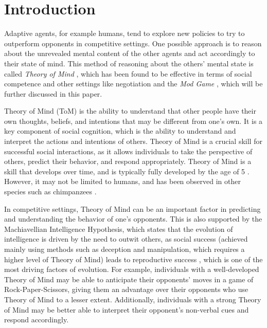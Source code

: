 \section{Introduction}\label{sec:introduction}

Adaptive agents, for example humans, tend to explore new policies to try to outperform opponents in competitive settings. One possible approach is to reason about the unrevealed mental content of the other agents and act accordingly to their state of mind. This method of reasoning about the others' mental state is called \textit{Theory of Mind} \citep{premack1978does}, which has been found to be effective in terms of social competence \citep{liddle2006higher} and other settings like negotiation \citep{de2017negotiating} and the \textit{Mod Game} \citep{veltman2019training}, which will be further discussed in this paper.

Theory of Mind (ToM) is the ability to understand that other people have their own thoughts, beliefs, and intentions that may be different from one's own. It is a key component of social cognition, which is the ability to understand and interpret the actions and intentions of others. Theory of Mind is a crucial skill for successful social interactions, as it allows individuals to take the perspective of others, predict their behavior, and respond appropriately. Theory of Mind is a skill that develops over time, and is typically fully developed by the age of 5 \citep{call2008does}. However, it may not be limited to humans, and has been observed in other species such as chimpanzees \citep{premack1978does}.

In competitive settings, Theory of Mind can be an important factor in predicting and understanding the behavior of one's opponents. This is also supported by the Machiavellian Intelligence Hypothesis, which states that the evolution of intelligence is driven by the need to outwit others, as social success (achieved mainly using methods such as deception and manipulation, which requires a higher level of Theory of Mind) leads to reproductive success \citep{gavrilets2006dynamics}, which is one of the most driving factors of evolution. For example, individuals with a well-developed Theory of Mind may be able to anticipate their opponents' moves in a game of Rock-Paper-Scissors, giving them an advantage over their opponents who use Theory of Mind to a lesser extent\citep{de2013much}. Additionally, individuals with a strong Theory of Mind may be better able to interpret their opponent's non-verbal cues and respond accordingly. 

